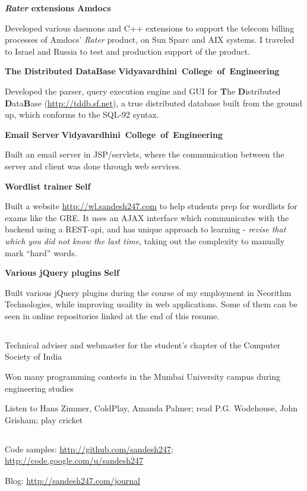 \documentclass[a4paper,11pt,final]{article}
\newcommand{\resumetitle}[1]{%
  \subsection*{%
    \Large\sc{\textbf{#1}}%
  }%
  
}%
\newcommand{\projexp}[2]{%
  \vspace{12pt}
  \noindent\textbf{{#1}}
  \hfill
  \hbox{\textbf{{#2}}}
  \\ \vspace{-12pt}
}
\newcommand{\resumedescheader}[1]{%
  \bigskip
  \resumetitle{#1}
}%
\begin{document}
\projexp{\textit{Rater} extensions}{Amdocs} 

\noindent Developed various daemons and C++ extensions to support the
telecom billing processes of Amdocs' \textit{Rater} product, on Sun
Sparc and AIX systems. I traveled to Israel and Russia to test and
production support of the product.

\projexp{The Distributed DataBase}{Vidyavardhini College of
  Engineering} 

\noindent Developed the parser, query execution engine and GUI for
\textbf{T}he \textbf{D}istributed \textbf{D}ata\textbf{B}ase
(\url{http://tddb.sf.net}), a true distributed database built from the
ground up, which conforms to the SQL-92 syntax.

\projexp{Email Server}{Vidyavardhini College of Engineering} 

\noindent Built an email server in JSP/servlets, where the
communication between the server and client was done through web
services.

\projexp{Wordlist trainer}{Self}

\noindent Built a website \url{http://wl.sandesh247.com} to help
students prep for wordlists for exams like the GRE. It uses an AJAX
interface which communicates with the backend using a REST-api, and
has unique approach to learning - \textit{revise that which you did
not know the last time}, taking out the complexity to manually mark
``hard'' words.

\projexp{Various jQuery plugins}{Self}

\noindent Built various jQuery plugins during the course of my
employment in Neorithm Technologies, while improving usaility in web
applications. Some of them can be seen in online repositories linked
at the end of this resume.


\resumedescheader{Extracurricular Activities}
\begin{itemize*}
\item Technical adviser and webmaster for the student's chapter of the Computer Society of India
\item Won many programming contests in the Mumbai University campus during engineering studies
\item Listen to Hans Zimmer, ColdPlay, Amanda Palmer; read P.G. Wodehouse, John Grisham; play cricket
\end{itemize*}

\resumedescheader{Links}
\begin{itemize*}
\item  Code samples: \url{http://github.com/sandesh247}; \url{http://code.google.com/u/sandesh247}
\item  Blog: \url{http://sandesh247.com/journal}
\end{itemize*}
\end{document}
